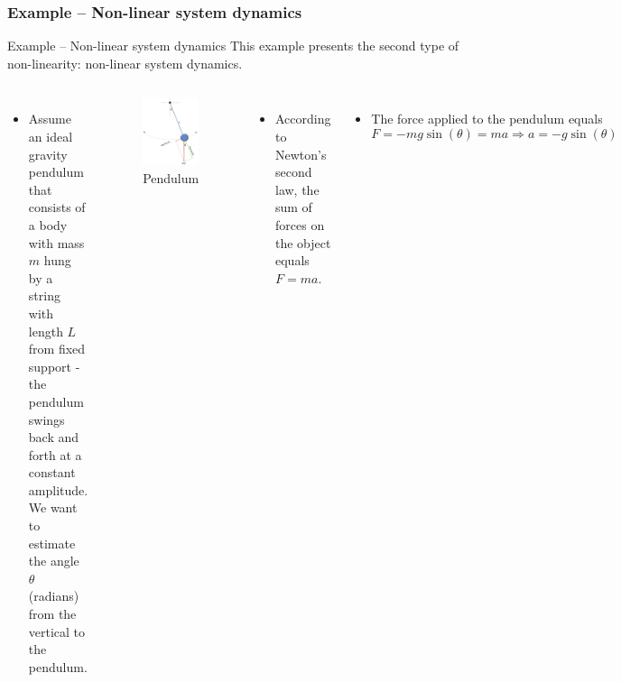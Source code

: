 \subsubsection{Example – Non-linear system dynamics}
\begin{frame}{Example – Non-linear system dynamics}
        This example presents the second type of non-linearity: non-linear system dynamics.   
\begin{columns}
        \begin{itemize}
            \item Assume an ideal gravity pendulum that consists of a body with mass $m$ hung by a string with length $L$ from fixed support - the pendulum swings back and forth at a constant amplitude. We want to estimate the angle $\theta$ (radians) from the vertical to the pendulum.
        \end{itemize}
        \vspace{-8pt}
        \begin{figure}
            \centering
            \includegraphics[width=0.50\linewidth]{Figures//Background3/Pendulum.png}
            \vspace{-8pt}
            \caption{Pendulum}
            \vspace{-10pt}
        \end{figure}
         \begin{itemize}
     \item According to Newton’s second law, the sum of forces on the object equals $F=ma$.
     \end{itemize}
 \begin{itemize}
     \item The force applied to the pendulum equals $$F = -mg\sin(\theta) = ma \Rightarrow a = -g\sin(\theta)$$

\end{itemize}
\end{columns}
\end{frame}
